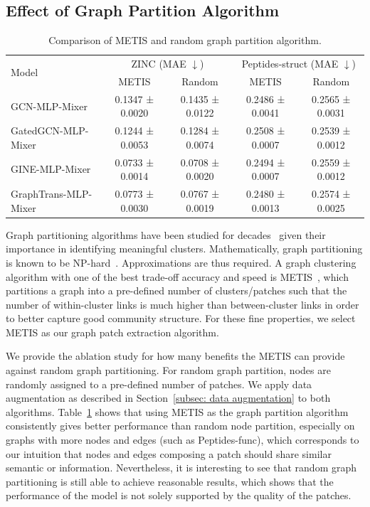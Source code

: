 \documentclass{article}
\begin{document}
\subsection{Effect of Graph Partition Algorithm}
\begin{table}[!ht]
\caption{Comparison of METIS and random graph partition algorithm.}
    \centering
    \footnotesize
    \begin{tabular}{lcccc}
    \toprule
         \multirow{2}{*}{Model}
         & \multicolumn{2}{c}{ZINC (MAE $\downarrow$)} 
         & \multicolumn{2}{c}{Peptides-struct (MAE $\downarrow$)} \\
         \cmidrule(lr){2-3}\cmidrule(lr){4-5}
         & METIS & Random & METIS & Random\\
         \midrule
    GCN-MLP-Mixer     
    & 0.1347 ± 0.0020 & 0.1435 ± 0.0122
    & 0.2486 ± 0.0041 & 0.2565 ± 0.0031\\
    GatedGCN-MLP-Mixer
    & 0.1244 ± 0.0053 & 0.1284 ± 0.0074
    & 0.2508 ± 0.0007 & 0.2539 ± 0.0012\\
    GINE-MLP-Mixer
    & 0.0733 ± 0.0014 & 0.0708 ± 0.0020
    & 0.2494 ± 0.0007 & 0.2559 ± 0.0012\\
    GraphTrans-MLP-Mixer
    & 0.0773 ± 0.0030 & 0.0767 ± 0.0019
    & 0.2480 ± 0.0013 & 0.2574 ± 0.0025\\
    \bottomrule
    \end{tabular}
    \label{tab:metis vs random graph partition}
\end{table}

Graph partitioning algorithms have been studied for decades~\citep{bulucc2016recent} given their importance in identifying meaningful clusters. Mathematically, graph partitioning is known to be NP-hard~\citep{chung1997spectral}. Approximations are thus required. A graph clustering algorithm with one of the best trade-off accuracy and speed is METIS~\citep{karypis1998metis}, which partitions a graph into a pre-defined number of clusters/patches such that the number of within-cluster links is much higher than between-cluster links in order to better capture good community structure. For these fine properties, we select METIS as our graph patch extraction algorithm.

We provide the ablation study for how many benefits the METIS can provide against random graph partitioning. For random graph partition, nodes are randomly assigned to a pre-defined number of patches. We apply data augmentation as described in Section~\ref{subsec: data augmentation} to both algorithms. Table~\ref{tab:metis vs random graph partition} shows that using METIS as the graph partition algorithm consistently gives better performance than random node partition, especially on graphs with more nodes and edges (such as Peptides-func), which corresponds to our intuition that nodes and edges composing a patch should share similar semantic or information. 
Nevertheless, it is interesting to see that random graph partitioning is still able to achieve reasonable results, which shows that the performance of the model is not solely supported by the quality of the patches.
\end{document}
